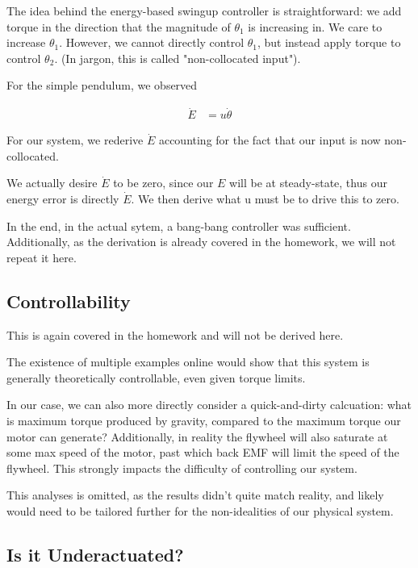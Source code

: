 \documentclass[conference]{IEEEtran}
\begin{document}
The idea behind the energy-based swingup controller is straightforward: we add
torque in the direction that the magnitude of $\theta_1$ is increasing in. We
care to increase $\theta_1$. However, we cannot directly control $\theta_1$, but
instead apply torque to control $\theta_2$. (In jargon, this is called
"non-collocated input").

For the simple pendulum, we observed 

\begin{align}
    \dot E &= u \dot \theta
\end{align}

For our system, we rederive $\dot E$ accounting for the fact that our input is
now non-collocated.

We actually desire $\dot E$ to be zero, since our $E$ will be at steady-state,
thus our energy error is directly $\dot E$. We then derive what u must be to
drive this to zero.


In the end, in the actual sytem, a bang-bang controller was sufficient.
Additionally, as the derivation is already covered in the homework, we will not
repeat it here.

\subsection{Controllability}

This is again covered in the homework and will not be derived here.

The existence of multiple examples online would show that this system is
generally theoretically controllable, even given torque limits. 

In our case, we can also more directly consider a quick-and-dirty calcuation:
what is maximum torque produced by gravity, compared to the maximum torque our
motor can generate? Additionally, in reality the flywheel will also saturate at
some max speed of the motor, past which back EMF will limit the speed of the
flywheel. This strongly impacts the difficulty of controlling our system. 

This analyses is omitted, as the results didn't quite match reality, and likely
would need to be tailored further for the non-idealities of our physical system.


\subsection{Is it Underactuated?}
\end{document}
